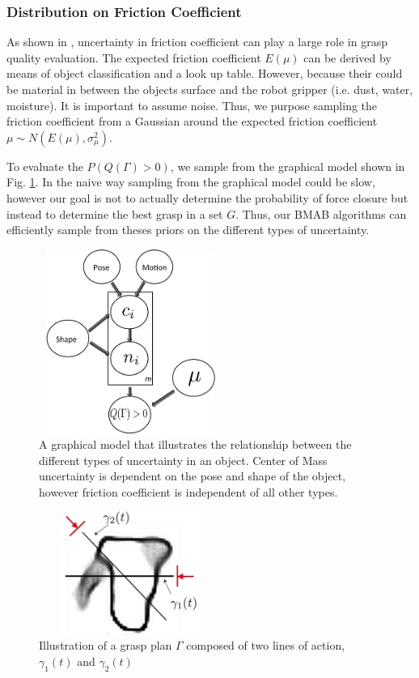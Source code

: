 \documentclass[letterpaper, 10 pt, conference]{ieeeconf}  %
\begin{document}
 
 \subsubsection{Distribution on Friction Coefficient}
As shown in \cite{zheng2005}, uncertainty in friction coefficient can play a large role in grasp quality evaluation. The expected friction coefficient $E(\mu)$ can be derived by means of object classification and a look up table. However, because their could be material in between the objects surface and the robot gripper (i.e. dust, water, moisture). It is important to assume noise.  Thus, we purpose sampling the friction coefficient from a Gaussian around the expected friction coefficient $\mu \sim N(E(\mu),\sigma_{\mu}^2)$. 
 
 
To evaluate the $P(Q(\Gamma)>0)$, we sample from the graphical model shown in Fig. \ref{fig:graphical_model}. In the naive way sampling from the graphical model could be slow, however our goal is not to actually determine the probability of force closure but instead to determine the best grasp in a set $G$. Thus, our BMAB algorithms can efficiently sample from theses priors on the different types of uncertainty.  
 
 
 



\begin{figure}[ht!]
\centering
\includegraphics[width = 6cm, height = 6cm]{figures/Slide8.jpg}
\caption{A graphical model that illustrates the relationship between the different types of uncertainty in an object. Center of Mass uncertainty is dependent on the pose and shape of the object, however friction coefficient is independent of all other types. }
\vspace*{-10pt}
\label{fig:graphical_model}
\end{figure}


\begin{figure}[ht!]
\centering
\includegraphics[width = 6cm, height = 4cm]{figures/Slide01.jpg}
\caption{Illustration of a grasp plan $\Gamma$ composed of two lines of action, $\gamma_1(t)$ and $\gamma_2(t)$}
\vspace*{-10pt}
\label{fig:line_of_action}
\end{figure}
\end{document}
